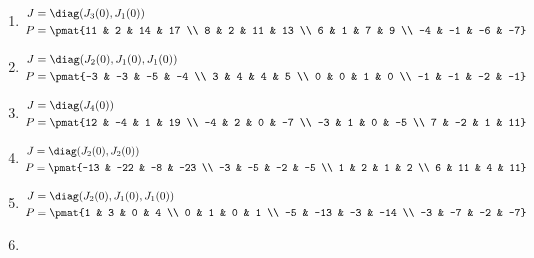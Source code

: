 \begin{enumerate}
\item

\begin{align*}
J &= \diag(J_{3}(0), J_{1}(0))\\
P &= \pmat{11 & 2 & 14 & 17 \\ 8 & 2 & 11 & 13 \\ 6 & 1 & 7 & 9 \\ -4 & -1 & -6 & -7}
\end{align*}

\item

\begin{align*}
J &= \diag(J_{2}(0), J_{1}(0), J_{1}(0))\\
P &= \pmat{-3 & -3 & -5 & -4 \\ 3 & 4 & 4 & 5 \\ 0 & 0 & 1 & 0 \\ -1 & -1 & -2 & -1}
\end{align*}

\item

\begin{align*}
J &= \diag(J_{4}(0))\\
P &= \pmat{12 & -4 & 1 & 19 \\ -4 & 2 & 0 & -7 \\ -3 & 1 & 0 & -5 \\ 7 & -2 & 1 & 11}
\end{align*}

\item

\begin{align*}
J &= \diag(J_{2}(0), J_{2}(0))\\
P &= \pmat{-13 & -22 & -8 & -23 \\ -3 & -5 & -2 & -5 \\ 1 & 2 & 1 & 2 \\ 6 & 11 & 4 & 11}
\end{align*}

\item

\begin{align*}
J &= \diag(J_{2}(0), J_{1}(0), J_{1}(0))\\
P &= \pmat{1 & 3 & 0 & 4 \\ 0 & 1 & 0 & 1 \\ -5 & -13 & -3 & -14 \\ -3 & -7 & -2 & -7}
\end{align*}

\item


\end{enumerate}
